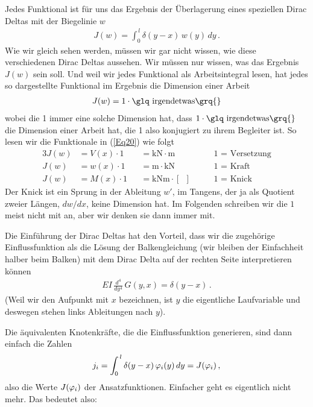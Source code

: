Jedes Funktional ist f\"{u}r uns das Ergebnis der \"{U}berlagerung eines speziellen Dirac Deltas mit der Biegelinie $w$
\begin{align}
J(w) = \int_0^{\,l} \delta(y-x)\,w(y)\,dy \,.
\end{align}
Wie wir gleich sehen werden, m\"{u}ssen wir gar nicht wissen, wie diese verschiedenen Dirac Deltas aussehen. Wir m\"{u}ssen nur wissen, was das Ergebnis $J(w)$ sein soll. Und weil wir jedes Funktional als Arbeitsintegral lesen, hat jedes so dargestellte Funktional im Ergebnis die Dimension einer Arbeit
\begin{align}
J(w) = 1 \cdot \text{\glq irgendetwas\grq{}}
\end{align}
wobei die 1 immer eine solche Dimension hat, dass $1 \cdot\text{\glq irgendetwas\grq{}}$ die Dimension einer Arbeit hat, die 1 also konjugiert zu ihrem Begleiter ist. So lesen wir die Funktionale in (\ref{Eq20}) wie folgt
\begin{alignat}{3}
J(w) &= V(x) \cdot 1 &&= \text{kN}  \cdot \text{m}\, &&\quad\text{1 = Versetzung} \\
J(w) &= w(x) \cdot 1 &&= \text{m}   \cdot \text{kN}\,&&\quad\text{1 = Kraft}\\
J(w) &= M(x) \cdot 1 &&= \text{kNm} \cdot [\,\,\,] \,      &&\quad\text{1 = Knick }
\end{alignat}
Der Knick ist ein Sprung in der Ableitung $w'$, im Tangens, der ja als Quotient zweier L\"{a}ngen, $dw/dx$, keine Dimension hat. Im Folgenden schreiben wir die $1$ meist nicht mit an, aber wir denken sie dann immer mit.

Die Einf\"{u}hrung der Dirac Deltas hat den Vorteil, dass wir die zugeh\"{o}rige Einflussfunktion als die L\"{o}sung der Balkengleichung (wir bleiben der Einfachheit halber beim Balken) mit dem Dirac Delta auf der rechten Seite interpretieren k\"{o}nnen
\begin{align}
EI\,\frac{d^4}{dy^4}\,G(y,x) = \delta (y-x)\,.
\end{align}
(Weil wir den Aufpunkt mit $x$ bezeichnen, ist $y$ die eigentliche Laufvariable und deswegen stehen links Ableitungen nach $y$).

Die \"{a}quivalenten Knotenkr\"{a}fte, die die Einflussfunktion generieren, sind dann einfach die Zahlen
\begin{align}
j_i = \int_0^{\,l} \delta(y-x)\,\varphi_i(y)\,dy = J(\varphi_i)\,,
\end{align}
also die Werte $J(\varphi_i)$ der Ansatzfunktionen. Einfacher geht es eigentlich nicht mehr.
Das bedeutet also:

